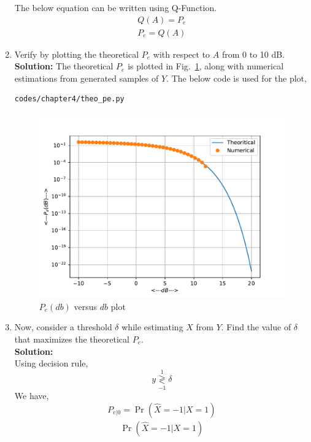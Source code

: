 \documentclass[journal,15pt,twocolumn]{IEEEtran}
\newcommand\figref{Fig.~\ref}
\providecommand{\pr}[1]{\ensuremath{\Pr\left(#1\right)}}
\newcommand{\solution}{\noindent \textbf{Solution: }}
\providecommand{\dec}[2]{\ensuremath{\overset{#1}{\underset{#2}{\gtrless}}}}
\begin{document}
\begin{enumerate}
The below equation can be written using Q-Function.
\begin{align}
    Q(A) = P_e \\
    P_e = Q(A)
\end{align} 
%
\item
Verify by plotting the theoretical $P_e$ with respect to $A$ from 0 to 10 dB.\\
\solution The theoretical $P_e$ is plotted in \figref{fig:bpsk_pe_snr}, along with numerical estimations from generated samples of $Y$. The below code is used for the plot, 
\begin{lstlisting}
codes/chapter4/theo_pe.py
\end{lstlisting}
\begin{figure}[H]
\centering
\includegraphics[width=\columnwidth]{./figs/chapter4/theo_pe.pdf}
\caption{$P_e(db)$ versus $db$ plot}
\label{fig:bpsk_pe_snr}
\end{figure}
%
\item Now, consider a threshold $\delta$  while estimating $X$ from $Y$. Find the value of $\delta$ that maximizes the theoretical $P_e$.\\
\label{prob:bpsk_delta_equi}
\solution \\
Using decision rule,
\begin{equation}
y \dec{1}{-1} \delta
\end{equation}
We have,
 \begin{equation}
	P_{e|0} = \pr{\hat{X} = -1|X=1}
\end{equation}
\begin{align}
	\pr{\hat{X} = -1|X=1} 
  \end{align}

\end{enumerate}
\end{document}
